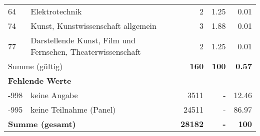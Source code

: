\begin{longtable}{lXrrr}
        64 & \multicolumn{1}{X}{Elektrotechnik} & %
          \num{2} &
          \num[round-mode=places,round-precision=2]{1.25} &
          \num[round-mode=places,round-precision=2]{0.01} \\

        74 & \multicolumn{1}{X}{Kunst, Kunstwissenschaft allgemein} & %
          \num{3} &
          \num[round-mode=places,round-precision=2]{1.88} &
          \num[round-mode=places,round-precision=2]{0.01} \\

        77 & \multicolumn{1}{X}{Darstellende Kunst, Film und Fernsehen, Theaterwissenschaft} & %
          \num{2} &
          \num[round-mode=places,round-precision=2]{1.25} &
          \num[round-mode=places,round-precision=2]{0.01} \\

     \midrule
     \multicolumn{2}{l}{Summe (gültig)} &
       \textbf{\num{160}} &
     \textbf{\num{100}} &
       \textbf{\num[round-mode=places,round-precision=2]{0.57}} \\
     \multicolumn{5}{l}{\textbf{Fehlende Werte}}\\
       -998 &
       keine Angabe &
         \num{3511} &
        - &
         \num[round-mode=places,round-precision=2]{12.46} \\
       -995 &
       keine Teilnahme (Panel) &
         \num{24511} &
        - &
         \num[round-mode=places,round-precision=2]{86.97} \\
     \midrule
     \multicolumn{2}{l}{\textbf{Summe (gesamt)}} &
          \textbf{\num{28182}} &
        \textbf{-} &
        \textbf{\num{100}} \\
     \bottomrule
     \end{longtable}
     
